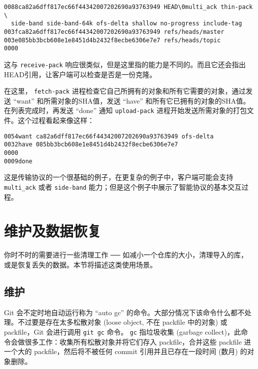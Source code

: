\documentclass[a4paper]{book}
\begin{document}
\begin{shaded}\begin{verbatim}
0088ca82a6dff817ec66f44342007202690a93763949 HEAD\0multi_ack thin-pack \
  side-band side-band-64k ofs-delta shallow no-progress include-tag
003fca82a6dff817ec66f44342007202690a93763949 refs/heads/master
003e085bb3bcb608e1e8451d4b2432f8ecbe6306e7e7 refs/heads/topic
0000
\end{verbatim}\end{shaded}

这与 \texttt{receive-pack} 响应很类似，但是这里指的能力是不同的。而且它还会指出HEAD引用，让客户端可以检查是否是一份克隆。

在这里， \texttt{fetch-pack} 进程检查它自己所拥有的对象和所有它需要的对象，通过发送 “want” 和所需对象的SHA值，发送 “have” 和所有它已拥有的对象的SHA值。在列表完成时，再发送 “done” 通知 \texttt{upload-pack} 进程开始发送所需对象的打包文件。这个过程看起来像这样：

\begin{shaded}\begin{verbatim}
0054want ca82a6dff817ec66f44342007202690a93763949 ofs-delta
0032have 085bb3bcb608e1e8451d4b2432f8ecbe6306e7e7
0000
0009done
\end{verbatim}\end{shaded}

这是传输协议的一个很基础的例子，在更复杂的例子中，客户端可能会支持 \texttt{multi\_ack} 或者 \texttt{side-band} 能力；但是这个例子中展示了智能协议的基本交互过程。

\section{维护及数据恢复}

你时不时的需要进行一些清理工作 ── 如减小一个仓库的大小，清理导入的库，或是恢复丢失的数据。本节将描述这类使用场景。

\subsection{维护}

Git 会不定时地自动运行称为 “auto gc” 的命令。大部分情况下该命令什么都不处理。不过要是存在太多松散对象 (loose object, 不在 packfile 中的对象) 或 packfile，Git 会进行调用 \texttt{git gc} 命令。 \texttt{gc} 指垃圾收集 (garbage collect)，此命令会做很多工作：收集所有松散对象并将它们存入 packfile，合并这些 packfile 进一个大的 packfile，然后将不被任何 commit 引用并且已存在一段时间 (数月) 的对象删除。
\end{document}
